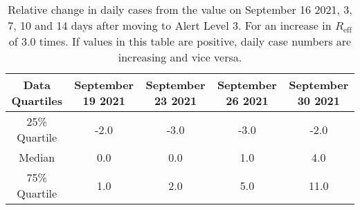 \begin{table}[h] 
 \centering 
 \begin{tabular}{c|c|c|c|c}
Data Quartiles & September 19 2021 & September 23 2021 & September 26 2021 & September 30 2021\\
\hline
25\% Quartile & -2.0 & -3.0 & -3.0 & -2.0\\
Median & 0.0 & 0.0 & 1.0 & 4.0\\
75\% Quartile & 1.0 & 2.0 & 5.0 & 11.0\\
\end{tabular}
\caption{Relative change in daily cases from the value on September 16 2021, 3, 7, 10 and 14 days after moving to Alert Level 3. For an increase in $R_\text{eff}$ of 3.0 times. If values in this table are positive, daily case numbers are increasing and vice versa.}
\label{tab:BP_predicted_cases_3.0}
\end{table}
